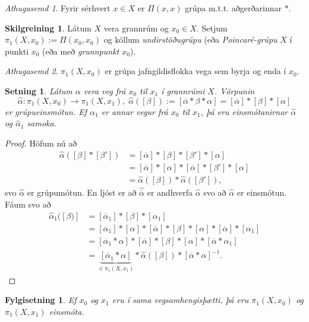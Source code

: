 \documentclass[a4paper,icelandic]{book}
\theoremstyle{definition}
\newtheorem{skilgr}{Skilgreining}[section]
\theoremstyle{plain}
\newtheorem{setn}{Setning}[section]
\newtheorem{fylgisetn}{Fylgisetning}[section]
\theoremstyle{remark}
\newtheorem*{ath}{Athugasemd}
\begin{document}
\begin{ath}
  Fyrir sérhvert $x\in X$ er $\Pi(x,x)$ grúpa m.t.t. aðgerðarinnar $*$.
\end{ath}
\begin{skilgr}
  Látum $X$ vera grannrúm og $x_0\in X$. Setjum
  $\pi_1(X,x_0):=\Pi(x_0,x_0)$ og köllum
  \emph{undirstöðugrúpu} (eða
  \emph{Poincaré-grúpu} $X$ í punkti $x_0$ (eða
  með \emph{grunnpunkt $x_0$}).
\end{skilgr}
\begin{ath}
  $\pi_1(X,x_0)$ er grúpa jafngildisflokka vega sem byrja og enda í
  $x_0$.
\end{ath}
\begin{setn}
  Látum $\alpha$ vera veg frá $x_0$ til $x_1$ í grannrúmi $X$. Vörpunin
  \[
  \hat\alpha:\pi_1(X,x_0)\to\pi_1(X,x_1),\;
  \hat\alpha([\beta]) := [\overline\alpha*\beta*\alpha] =
  [\overline\alpha]*[\beta]*[\alpha]
  \]
  er grúpueinsmótun. Ef $\alpha_1$ er annar vegur frá $x_0$ til $x_1$,
  þá eru einsmótanirnar $\hat\alpha$ og $\hat\alpha_1$ samoka.
\end{setn}
\begin{proof}
  Höfum nú að 
  \begin{align*}
    \hat\alpha([\beta]*[\beta'])
    &= [\overline\alpha]*[\beta]*[\beta']*[\alpha]\\
    &= [\overline\alpha]*[\alpha]*[\overline\alpha]*[\beta']*[\alpha]\\
    &= \hat\alpha([\beta])*\hat\alpha([\beta']),
  \end{align*}
  svo $\hat\alpha$ er grúpumótun. En ljóst er að $\hat{\overline\alpha}$
  er andhverfa $\hat\alpha$ svo að $\hat\alpha$ er einsmótun. Fáum svo
  að 
  \begin{align*}
    \hat\alpha_1([\beta)]
    &= [\overline\alpha_1]*[\beta]*[\alpha_1]\\
    &= [\overline\alpha_1]*[\alpha]*[\overline\alpha]*[\beta]*[\alpha]*[\overline\alpha]*[\alpha_1] \\
    &= [\overline\alpha_1*\alpha]*[\overline\alpha]*[\beta]*[\alpha]*[\overline\alpha*\alpha_1] \\
    &= \underbrace{[\overline\alpha_1*\alpha]}_{\in\pi_1(X,x_1)}*\hat\alpha([\beta])*[\overline\alpha*\alpha]^{-1}.
  \end{align*}
\end{proof}
\begin{fylgisetn}
  Ef $x_0$ og $x_1$ eru í sama vegsamhengisþætti, þá eru $\pi_1(X,x_0)$
  og $\pi_1(X,x_1)$ einsmóta.
\end{fylgisetn}
\end{document}
